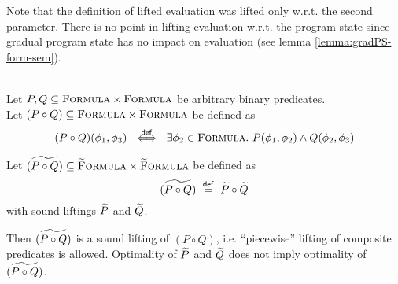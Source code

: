 Note that the definition of lifted evaluation was lifted only w.r.t. the second parameter.
There is no point in lifting evaluation w.r.t. the program state since gradual program state has no impact on evaluation (see lemma \ref{lemma:gradPS-form-sem}).

\begin{comment}
We define denotational semantics of gradual formulas analogous to the non-gradual variant (see definition \ref{def:frm-den-sem}):
\begin{definition}[Denotational Formula Semantics $\envs{\cdot}$ of Gradual Formulas]~\\
    \label{def:gfrm-den-sem}
    Let $\envs{\cdot} : \setGFormula \rightarrow \PP^{\setProgramState}$ be defined as
    \begin{displaymath}
    \envs{\grad{\phi}} \defeq \{~ \pi \in \setProgramState ~|~ \evalgphiGen{\pi}{\grad{\phi}} ~\}
    \end{displaymath}
\end{definition}
\end{comment}

\begin{lemma}
    \label{lemma:pred-lift-comp}~\\
    Let $P, Q \subseteq \textup{\textsc{Formula}} \times \textup{\textsc{Formula}}$ be arbitrary binary predicates.\\
    Let $(P \circ Q) \subseteq \textup{\textsc{Formula}} \times \textup{\textsc{Formula}}$ be defined as
    \begin{displaymath}
    (P \circ Q)(\phi_1, \phi_3) ~\overset{\textup{\textmd{\textsf{def}}}}{\iff}~ \exists \phi_2 \in \textup{\textsc{Formula}}.~ P(\phi_1, \phi_2) \wedge Q(\phi_2, \phi_3)
    \end{displaymath}
    
    Let $\widetilde{(P \circ Q)} \subseteq \textup{\textsc{\ensuremath{\widetilde{\text{F}}}ormula}} \times \textup{\textsc{\ensuremath{\widetilde{\text{F}}}ormula}}$ be defined as
    \begin{displaymath}
    \widetilde{(P \circ Q)} ~\overset{\textup{\textmd{\textsf{def}}}}{=}~ \widetilde{P} \circ \widetilde{Q}
    \end{displaymath}
    with sound liftings $\widetilde{P}$ and $\widetilde{Q}$.
    
    Then $\widetilde{(P \circ Q)}$ is a sound lifting of $(P \circ Q)$, i.e. “piecewise” lifting of composite predicates is allowed.
    Optimality of $\widetilde{P}$ and $\widetilde{Q}$ does not imply optimality of $\widetilde{(P \circ Q)}$. %
\end{lemma}

